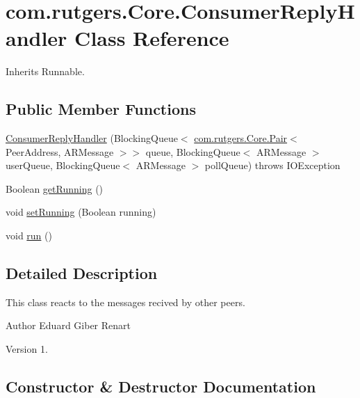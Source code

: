 \hypertarget{classcom_1_1rutgers_1_1Core_1_1ConsumerReplyHandler}{}\section{com.\+rutgers.\+Core.\+Consumer\+Reply\+Handler Class Reference}
\label{classcom_1_1rutgers_1_1Core_1_1ConsumerReplyHandler}


Inherits Runnable.

\subsection*{Public Member Functions}
\begin{DoxyCompactItemize}
\item 
\hyperlink{classcom_1_1rutgers_1_1Core_1_1ConsumerReplyHandler_a850dfa544830ff244044c945de580e65}{Consumer\+Reply\+Handler} (Blocking\+Queue$<$ \hyperlink{classcom_1_1rutgers_1_1Core_1_1Pair}{com.\+rutgers.\+Core.\+Pair}$<$ Peer\+Address, A\+R\+Message $>$$>$ queue, Blocking\+Queue$<$ A\+R\+Message $>$ user\+Queue, Blocking\+Queue$<$ A\+R\+Message $>$ poll\+Queue)  throws I\+O\+Exception 
\item 
Boolean \hyperlink{classcom_1_1rutgers_1_1Core_1_1ConsumerReplyHandler_a02a5478d120604f1c5b9ea578c9a5158}{get\+Running} ()
\item 
void \hyperlink{classcom_1_1rutgers_1_1Core_1_1ConsumerReplyHandler_a8a85b5b1100b63a6d713c0bace5086ac}{set\+Running} (Boolean running)
\item 
void \hyperlink{classcom_1_1rutgers_1_1Core_1_1ConsumerReplyHandler_a975390fd28870020fe1ec8a98c539eca}{run} ()
\end{DoxyCompactItemize}


\subsection{Detailed Description}
This class reacts to the messages recived by other peers.

\begin{DoxyAuthor}{Author}
Eduard Giber Renart 
\end{DoxyAuthor}
\begin{DoxyVersion}{Version}
1. 
\end{DoxyVersion}


\subsection{Constructor \& Destructor Documentation}
\mbox{\label{classcom_1_1rutgers_1_1Core_1_1ConsumerReplyHandler_a850dfa544830ff244044c945de580e65}} 
